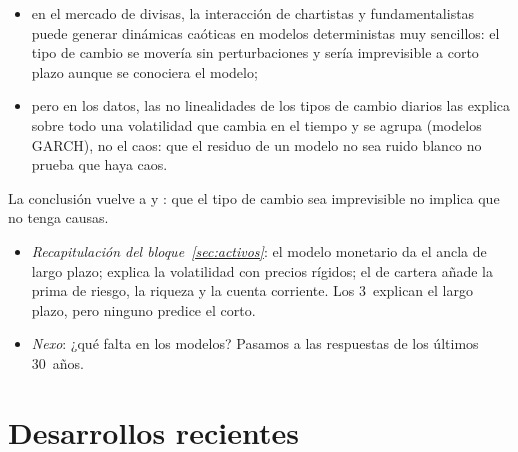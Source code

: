 \documentclass[11pt]{article}
\begin{document}
\begin{anotaciones}[unbreakable]
\begin{itemize}
\item en el mercado de divisas, la interacción de chartistas y fundamentalistas puede generar dinámicas caóticas en modelos deterministas muy sencillos\nocite{DeGrauweDewachterEmbrechts1993}: el tipo de cambio se movería sin perturbaciones y sería imprevisible a corto plazo aunque se conociera el modelo;
\item pero en los datos, las no linealidades de los tipos de cambio diarios las explica sobre todo una volatilidad que cambia en el tiempo y se agrupa (modelos GARCH), no el caos\nocite{Hsieh1989Testing}: que el residuo de un modelo no sea ruido blanco no prueba que haya caos.
\end{itemize}
La conclusión vuelve a  y : que el tipo de cambio sea imprevisible no implica que no tenga causas.
\end{anotaciones}

\begin{itemize}
\item \emph{Recapitulación del bloque~\ref{sec:activos}}: el modelo monetario da el ancla de largo plazo;  explica la volatilidad con precios rígidos; el de cartera añade la prima de riesgo, la riqueza y la cuenta corriente. Los 3~explican el largo plazo, pero ninguno predice el corto.
\item \emph{Nexo}: ¿qué falta en los modelos? Pasamos a las respuestas de los últimos 30~años.
\end{itemize}

\section{Desarrollos recientes}\label{sec:recientes}
\end{document}
